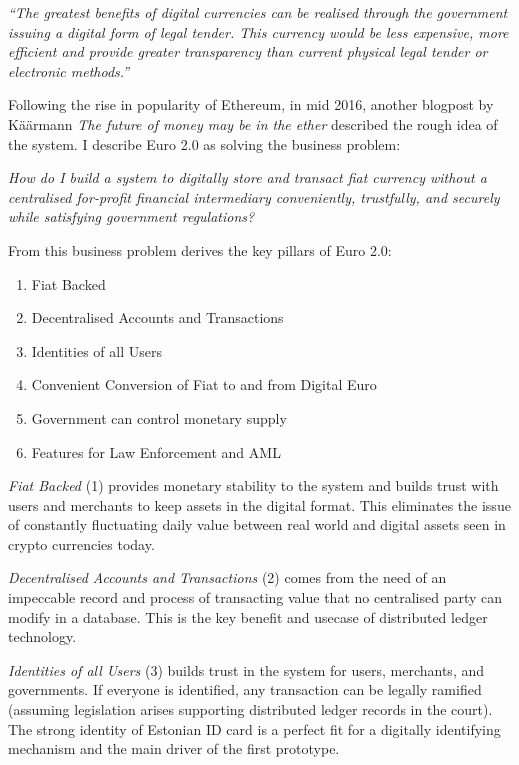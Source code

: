 \documentclass[12pt]{article} %
\begin{document}
{{\begin{quoting}
	\textit{``The greatest benefits of digital currencies can be realised through the government issuing a digital form of legal tender. This currency would be less expensive, more efficient and provide greater transparency than current physical legal tender or electronic methods.''}
\end{quoting}

Following the rise in popularity of Ethereum, in mid 2016, another blogpost by Käärmann \textit{The future of money may be in the ether}\cite{kaarmann2016ether} described the rough idea of the system. I describe Euro 2.0 as solving the business problem:

\begin{quoting}
	\textit{How do I build a system to digitally store and transact fiat currency without a centralised for-profit financial intermediary conveniently, trustfully, and securely while satisfying government regulations?}
\end{quoting}

From this business problem derives the key pillars of Euro 2.0:

\begin{enumerate}
	\item Fiat Backed
	\item Decentralised Accounts and Transactions
	\item Identities of all Users
	\item Convenient Conversion of Fiat to and from Digital Euro
	\item Government can control monetary supply
	\item Features for Law Enforcement and AML
\end{enumerate}

\textit{Fiat Backed} (1) provides monetary stability to the system and builds trust with users and merchants to keep assets in the digital format. This eliminates the issue of constantly fluctuating daily value between real world and digital assets seen in crypto currencies today.

\textit{Decentralised Accounts and Transactions} (2) comes from the need of an impeccable record and process of transacting value that no centralised party can modify in a database. This is the key benefit and usecase of distributed ledger technology.

\textit{Identities of all Users} (3) builds trust in the system for users, merchants, and governments. If everyone is identified, any transaction can be legally ramified (assuming legislation arises supporting distributed ledger records in the court). The strong identity of Estonian ID card is a perfect fit for a digitally identifying mechanism and the main driver of the first prototype.

}}
\end{document}
